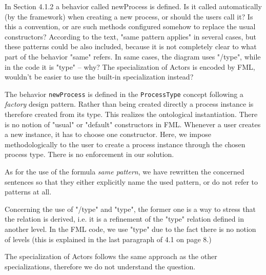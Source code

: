\documentclass[10pt]{article}
\begin{document}
\begin{response}{In Section 4.1.2 a behavior called newProcess is defined. Is it called automatically (by the framework) when creating a new process, or should the users call it? Is this a convention, or are such methods configured somehow to replace the usual constructors? According to the text, "same pattern applies" in several cases, but these patterns could be also included, because it is not completely clear to what part of the behavior "same" refers. In same cases, the diagram uses "/type", while in the code it is "type" -- why? The specialization of Actors is encoded by FML, wouldn’t be easier to use the built-in specialization instead?}

The behavior \texttt{newProcess} is defined in the \texttt{ProcessType} concept following a \emph{factory} design pattern. Rather than being created directly a process instance is therefore created from its type. This realizes the ontological instantiation. There is no notion of "usual" or "default" constructors in FML. Whenever a user creates a new instance, it has to choose one constructor. Here, we impose methodologically to the user to create a process instance through the chosen process type. There is no enforcement in our solution.

As for the use of the formula \emph{same pattern}, we have rewritten the concerned sentences so that they either explicitly name the used pattern, or do not refer to patterns at all.

Concerning the use of "/type" and "type", the former one is a way to stress that the relation is derived, i.e. it is a refinement of the "type" relation defined in another level. In the FML code, we use "type" due to the fact there is no notion of levels (this is explained in the last paragraph of 4.1 on page 8.)

The specialization of Actors follows the same approach as the other specializations, therefore we do not understand the question.%

\end{response}
\end{document}
